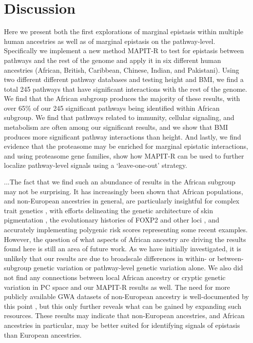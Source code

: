 \documentclass[12pt,a4paper]{article}
\begin{document}
\section{Discussion}\label{InterPath-Discussion}

Here we present both the first explorations of marginal epistasis within multiple human ancestries as well as of marginal epistasis on the pathway-level. Specifically we implement a new method MAPIT-R to test for epistasis between pathways and the rest of the genome and apply it in six different human ancestries (African, British, Caribbean, Chinese, Indian, and Pakistani). Using two different different pathway databases and testing height and BMI, we find a total 245 pathways that have significant interactions with the rest of the genome. We find that the African subgroup produces the majority of these results, with over 65\% of our 245 significant pathways being identified within African subgroup. We find that pathways related to immunity, cellular signaling, and metabolism are often among our significant results, and we show that BMI produces more significant pathway interactions than height. And lastly, we find evidence that the proteasome may be enriched for marginal epistatic interactions, and using proteasome gene families, show how MAPIT-R can be used to further localize pathway-level signals using a `leave-one-out' strategy. 

...The fact that we find such an abundance of results in the African subgroup may not be surprising. It has increasingly been shown that African populations, and non-European ancestries in general, are particularly insightful for complex trait genetics \citep{Dumitrescu2011,Rotimi2017,Choudhury2018,Martin2018,Mogil2018,Bien2019,Kuchenbaecker2019,Wojcik2019,Zhong2019,Bentley2020}, with efforts delineating the genetic architecture of skin pigmentation \citep{Martin2017b,Crawford2017b}, the evolutionary histories of FOXP2 and other loci \citep{Atkinson2018,Sugden2018}, and accurately implementing polygenic risk scores \citep{Duncan2019,Marnetto2020,Mostafavi2020} representing some recent examples. However, the question of what aspects of African ancestry are driving the results found here is still an area of future work. As we have initially investigated, it is unlikely that our results are due to broadscale differences in within- or between-subgroup genetic variation or pathway-level genetic variation alone. We also did not find any connections between local African ancestry or cryptic genetic variation in PC space and our MAPIT-R results as well. The need for more publicly available GWA datasets of non-European ancestry is well-documented by this point \citep{Need2009,Popejoy2016,Gurdasani2019,Martin2019,Sirugo2019}, but this only further reveals what can be gained by expanding such resources. These results may indicate that non-European ancestries, and African ancestries in particular, may be better suited for identifying signals of epistasis than European ancestries. 
\end{document}
